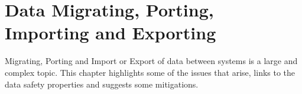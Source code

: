 %
\chapter{Data Migrating, Porting, Importing and Exporting}\label{bkm:migration}
%

Migrating, Porting and Import or Export of data between systems is a large and complex topic.
This chapter highlights some of the issues that arise, links to the data safety properties and suggests some mitigations.

